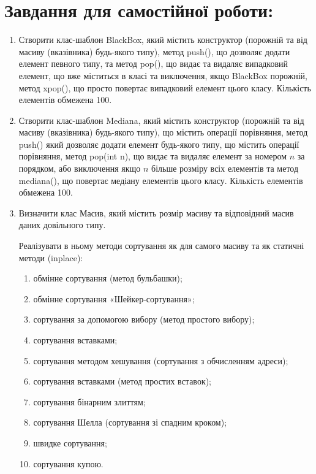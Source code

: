 \documentclass[]{article}
\makeatletter
\newcommand{\xslalph}[1]{\expandafter\@xslalph\csname c@#1\endcsname}
\newcommand{\@xslalph}[1]{%
    \ifcase#1\or а\or б\or в\or г\or д\or e\or є\or ж\or з\or i%
    \or й\or к\or л\or м\or н\or о\or п\or р\or с\or т%
    \or у\or ф\or х\or ц\or ч\or ш\or ю\or я\or аа\or бб\or вв%
    \else\@ctrerr\fi%
}
\makeatother
\begin{document}
\section{Завдання для самостійної роботи:}



\begin{enumerate}
\def\labelenumi{\arabic{enumi})}
\setcounter{enumi}{2}
\item
  Створити клас-шаблон BlackBox, який містить конструктор
  (порожній та від масиву (вказівника) будь-якого типу), метод push(),
  що дозволяє додати елемент певного типу, та метод pop(), що видає та
  видаляє випадковий елемент, що вже міститься в класі та виключення,
  якщо BlackBox порожній, метод xpop(), що просто повертає випадковий
  елемент цього класу. Кількість елементів обмежена 100.
\item
  Створити клас-шаблон Mediana, який містить конструктор (порожній та
  від масиву (вказівника) будь-якого типу), що містить операції
  порівняння, метод push() який дозволяє додати елемент будь-якого типу,
  що містить операції порівняння, метод pop(int n), що видає та
  видаляє елемент за номером $n$ за порядком, або виключення якщо $n$ більше
  розміру всіх елементів та метод mediana(), що повертає медіану елементів
  цього класу. Кількість елементів обмежена 100.
\item
Визначити клас Масив, який містить розмір масиву та
відповідний масив даних довільного типу.

Реалізувати в ньому методи сортування як для самого масиву та як статичні методи (inplace):
\begin{enumerate}[label=\xslalph*)]
\item
обмінне сортування (метод бульбашки);
\item
обмінне сортування «Шейкер-сортування»;
\item
сортування за допомогою вибору (метод простого вибору);
\item
сортування вставками;
\item
сортування методом хешування (сортування з обчисленням адреси);
\item
сортування вставками (метод простих вставок);
\item
сортування бінарним злиттям;
\item
сортування Шелла (сортування зі спадним кроком);
\item
швидке сортування;
\item
сортування купою.
\end{enumerate}


\end{enumerate}
\end{document}
